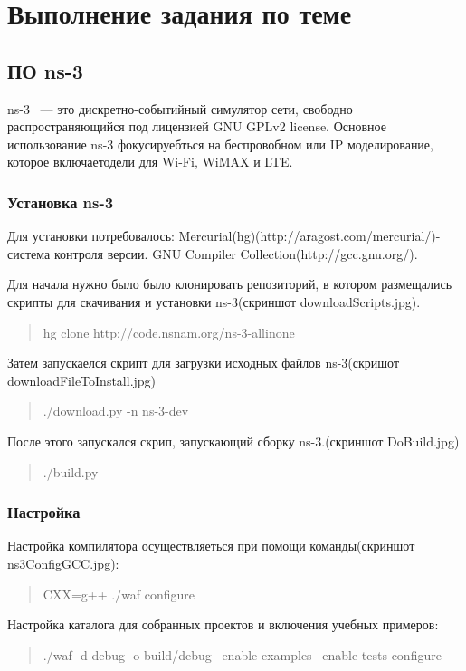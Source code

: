 \documentclass[14pt,a4paper]{article}
\begin{document}
\section{Выполнение задания по теме}
\subsection{ПО ns-3}
ns-3 ~--- это дискретно-событийный симулятор сети, свободно распространяющийся
под лицензией  GNU GPLv2 license. Основное использование ns-3 фокусируебться на
беспровобном или IP моделирование, которое включаетодели для Wi-Fi, WiMAX и LTE.
\subsubsection{Установка ns-3}
Для установки потребовалось:
Mercurial(hg)(http://aragost.com/mercurial/)-система контроля версии.
GNU Compiler Collection(http://gcc.gnu.org/).

Для начала нужно было было клонировать репозиторий, в котором размещались
скрипты для скачивания и установки ns-3(скриншот downloadScripts.jpg).
\begin{quote}
hg clone http://code.nsnam.org/ns-3-allinone
\end{quote}
\vspace{0.75cm}
Затем запускаелся скрипт для загрузки исходных файлов ns-3(скришот
downloadFileToInstall.jpg)
\begin{quote}
./download.py -n ns-3-dev
\end{quote}
\vspace{0.75cm}
После этого запускался скрип, запускающий сборку ns-3.(скриншот DoBuild.jpg) 
\begin{quote}
./build.py
\end{quote}
\vspace{0.75cm}
\subsubsection{Настройка}
Настройка компилятора осуществляеться при помощи команды(скриншот
ns3ConfigGCC.jpg):
\begin{quote}
CXX=g++ ./waf configure
\end{quote}
\vspace{0.75cm}
Настройка каталога для собранных проектов и включения учебных примеров:
\begin{quote}
./waf -d debug -o build/debug --enable-examples --enable-tests configure
\end{quote}
\vspace{0.75cm}
\end{document}
